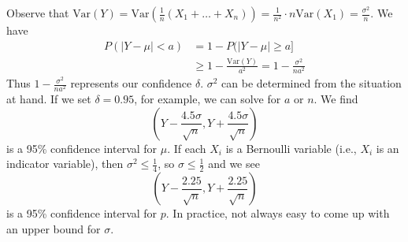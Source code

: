 \documentclass[10pt]{article}
\begin{document}
\begin{multicols}{2}
\begin{enumerate}
\begin{enumerate}
            Observe that $\text{Var}(Y)=\text{Var}(\frac{1}{n}(X_1+\hdots+X_n)) = \frac{1}{n^2} \cdot n \text{Var}(X_1) = \frac{\sigma^2}{n}$. We have
            \begin{align*}
                P(|Y-\mu| < a) &= 1-P(|Y-\mu| \geq a] \\
                &\geq 1 - \frac{\text{Var}(Y)}{a^2}=1-\frac{\sigma^2}{na^2}
            \end{align*}
            Thus $1-\frac{\sigma^2}{na^2}$ represents our confidence $\delta$. $\sigma^2$ can be determined from the situation at hand. If we set $\delta=0.95$, for example, we can solve for $a$ or $n$. We find $$\left(Y-\frac{4.5\sigma}{\sqrt{n}}, Y+\frac{4.5\sigma}{\sqrt{n}}\right)$$ is a 95\% confidence interval for $\mu$. If each $X_i$ is a Bernoulli variable (i.e., $X_i$ is an indicator variable), then $\sigma^2 \leq \frac{1}{4}$, so $\sigma \leq \frac{1}{2}$ and we see $$\left(Y-\frac{2.25}{\sqrt{n}}, Y+\frac{2.25}{\sqrt{n}}\right)$$ is a 95\% confidence interval for $p$. In practice, not always easy to come up with an upper bound for $\sigma$.
        \end{enumerate}
        

\end{enumerate}
\end{multicols}
\end{document}

